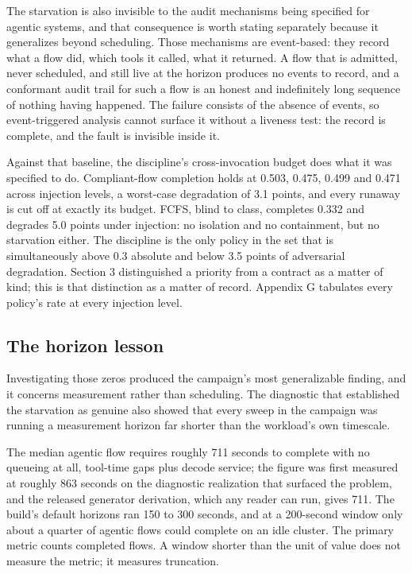 The starvation is also invisible to the audit mechanisms being specified
for agentic systems, and that consequence is worth stating separately
because it generalizes beyond scheduling. Those mechanisms are
event-based: they record what a flow did, which tools it called, what it
returned. A flow that is admitted, never scheduled, and still live at
the horizon produces no events to record, and a conformant audit trail
for such a flow is an honest and indefinitely long sequence of nothing
having happened. The failure consists of the absence of events, so
event-triggered analysis cannot surface it without a liveness test: the
record is complete, and the fault is invisible inside it.

Against that baseline, the discipline's cross-invocation budget does
what it was specified to do. Compliant-flow completion holds at 0.503,
0.475, 0.499 and 0.471 across injection levels, a worst-case degradation
of 3.1 points, and every runaway is cut off at exactly its budget. FCFS,
blind to class, completes 0.332 and degrades 5.0 points under injection:
no isolation and no containment, but no starvation either. The
discipline is the only policy in the set that is simultaneously above
0.3 absolute and below 3.5 points of adversarial degradation. Section 3
distinguished a priority from a contract as a matter of kind; this is
that distinction as a matter of record. Appendix G tabulates every
policy's rate at every injection level.

\subsection{The horizon lesson}

Investigating those zeros produced the campaign's most generalizable
finding, and it concerns measurement rather than scheduling. The
diagnostic that established the starvation as genuine also showed that
every sweep in the campaign was running a measurement horizon far shorter
than the workload's own timescale.

The median agentic flow requires roughly 711 seconds to complete with no
queueing at all, tool-time gaps plus decode service; the figure was first
measured at roughly 863 seconds on the diagnostic realization that
surfaced the problem, and the released generator derivation, which any
reader can run, gives 711. The build's default horizons ran 150 to 300
seconds, and at a 200-second window only about a quarter of agentic flows
could complete on an idle cluster. The primary metric counts completed
flows. A window shorter than the unit of value does not measure the
metric; it measures truncation.

